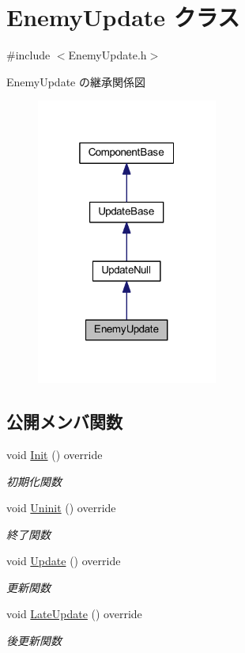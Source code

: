 \hypertarget{class_enemy_update}{}\section{Enemy\+Update クラス}
\label{class_enemy_update}


{\ttfamily \#include $<$Enemy\+Update.\+h$>$}



Enemy\+Update の継承関係図\nopagebreak
\begin{figure}[H]
\begin{center}
\leavevmode
\includegraphics[width=169pt]{class_enemy_update__inherit__graph}
\end{center}
\end{figure}
\subsection*{公開メンバ関数}
\begin{DoxyCompactItemize}
\item 
void \mbox{\hyperlink{class_enemy_update_a5b68696e964f71fca73c9143e3770c9d}{Init}} () override
\begin{DoxyCompactList}\small\item\em 初期化関数 \end{DoxyCompactList}\item 
void \mbox{\hyperlink{class_enemy_update_a294a5d4c65551af43e933cb65036f279}{Uninit}} () override
\begin{DoxyCompactList}\small\item\em 終了関数 \end{DoxyCompactList}\item 
void \mbox{\hyperlink{class_enemy_update_ae9662f3a2d064dc69c0d68293e60f051}{Update}} () override
\begin{DoxyCompactList}\small\item\em 更新関数 \end{DoxyCompactList}\item 
void \mbox{\hyperlink{class_enemy_update_ae14e4ebb42ad9043534e53edcba5b242}{Late\+Update}} () override
\begin{DoxyCompactList}\small\item\em 後更新関数 \end{DoxyCompactList}\end{DoxyCompactItemize}
